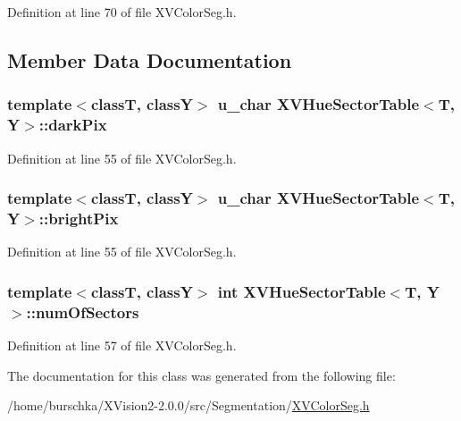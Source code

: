 Definition at line 70 of file XVColor\-Seg.h.

\subsection{Member Data Documentation}
\label{XVHueSectorTable_n0}
\hypertarget{class_XVHueSectorTable_n0}{
\subsubsection[darkPix]{\setlength{\rightskip}{0pt plus 5cm}template$<$classT, classY$>$ u\_\-char XVHue\-Sector\-Table$<$T, Y$>$::dark\-Pix}}




Definition at line 55 of file XVColor\-Seg.h.\label{XVHueSectorTable_n1}
\hypertarget{class_XVHueSectorTable_n1}{
\subsubsection[brightPix]{\setlength{\rightskip}{0pt plus 5cm}template$<$classT, classY$>$ u\_\-char XVHue\-Sector\-Table$<$T, Y$>$::bright\-Pix}}




Definition at line 55 of file XVColor\-Seg.h.\label{XVHueSectorTable_n2}
\hypertarget{class_XVHueSectorTable_n2}{
\subsubsection[numOfSectors]{\setlength{\rightskip}{0pt plus 5cm}template$<$classT, classY$>$ int XVHue\-Sector\-Table$<$T, Y$>$::num\-Of\-Sectors}}




Definition at line 57 of file XVColor\-Seg.h.

The documentation for this class was generated from the following file:\begin{CompactItemize}
\item 
/home/burschka/XVision2-2.0.0/src/Segmentation/\hyperlink{XVColorSeg.h-source}{XVColor\-Seg.h}\end{CompactItemize}
